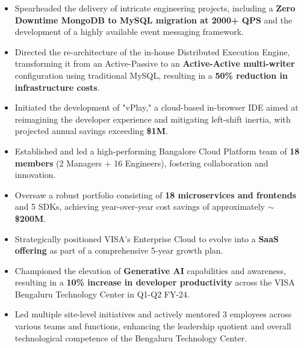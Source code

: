 \begin{itemize}
    \item Spearheaded the delivery of intricate engineering projects, including a \textbf{Zero Downtime MongoDB to MySQL migration at 2000+ QPS} and the development of a highly available event messaging framework.
    \item Directed the re-architecture of the in-house Distributed Execution Engine, transforming it from an Active-Passive to an \textbf{Active-Active multi-writer} configuration using traditional MySQL, resulting in a \textbf{50\% reduction in infrastructure costs}.
    \item Initiated the development of "vPlay," a cloud-based in-browser IDE aimed at reimagining the developer experience and mitigating left-shift inertia, with projected annual savings exceeding \textbf{\$1M}.
    \item Established and led a high-performing Bangalore Cloud Platform team of \textbf{18 members} (2 Managers + 16 Engineers), fostering collaboration and innovation.
    \item Oversaw a robust portfolio consisting of \textbf{18 microservices and frontends} and 5 SDKs, achieving year-over-year cost savings of approximately \textbf{\(\sim\)\$200M}.
    \item Strategically positioned VISA's Enterprise Cloud to evolve into a \textbf{SaaS offering} as part of a comprehensive 5-year growth plan.
    \item Championed the elevation of \textbf{Generative AI} capabilities and awareness, resulting in a \textbf{10\% increase in developer productivity} across the VISA Bengaluru Technology Center in Q1-Q2 FY-24.
    \item Led multiple site-level initiatives and actively mentored 3 employees across various teams and functions, enhancing the leadership quotient and overall technological competence of the Bengaluru Technology Center.
  \end{itemize}